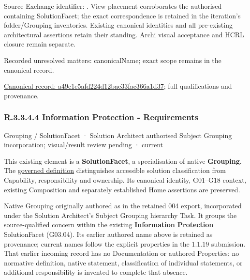 Source Exchange identifier: \texttt{}. View placement corroborates
the authorised containing SolutionFacet; the exact correspondence is retained in the
iteration's folder/Grouping inventories. Existing canonical identities and all
pre-existing architectural assertions retain their standing. Archi visual
acceptance and HCRL closure remain separate.


{\small Recorded unresolved matters: canonicalName; exact scope remains in the canonical record.}\par
{\footnotesize \href{../../../../../../../continuum/grouping/a49c1e5afd224d12bae33fac366a1d37.md}{Canonical record: a49c1e5afd224d12bae33fac366a1d37}; full qualifications and provenance.}\par
\subsubsection*{R.3.3.4.4 Information Protection - Requirements}
\label{navigation:R.3.3.4.4}

\label{element:e84139e878c740ab81c558cbc7ec6548}
{\small Grouping / SolutionFacet · Solution Architect authorised Subject Grouping incorporation; visual/result review pending · current}\par

This existing element is a \textbf{SolutionFacet}, a specialisation of native
\textbf{Grouping}. The \href{\detokenize{../../../../../../../governance/continuum-representation.md#solutionfacet-classification--1119-candidate}}{governed definition}
distinguishes accessible solution classification from Capability, responsibility
and ownership. Its canonical identity, G01–G18 context, existing Composition
and separately established Home assertions are preserved.



Native Grouping originally authored as \texttt{} in the retained 004 export,
incorporated under the Solution Architect's Subject Grouping hierarchy Task.
It groups the source-qualified \texttt{} concern within
the existing \textbf{Information Protection} SolutionFacet (G03.04). Its earlier authored name above is retained as provenance; current names
follow the explicit properties in the 1.1.19 submission.
That earlier incoming record has no Documentation or authored Properties; no normative
definition, native statement, classification of individual statements, or
additional responsibility is invented to complete that absence.




